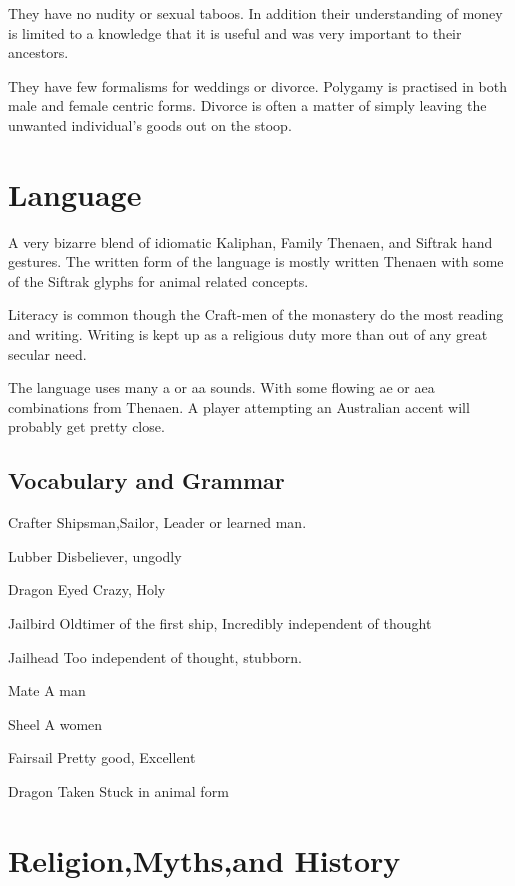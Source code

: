 They have no nudity or sexual taboos. In addition their understanding
of money is limited to a knowledge that it is useful and was very
important to their ancestors.

They have few formalisms for weddings or divorce. Polygamy is practised
in both male and female centric forms. Divorce is often a matter of 
simply leaving the unwanted individual's goods out on the stoop. 

\section{Language}

A very bizarre blend of idiomatic Kaliphan, Family Thenaen, and
Siftrak hand gestures. The written form of the language is mostly 
written Thenaen with some of the Siftrak glyphs for animal related concepts.

Literacy is common though the Craft-men of the monastery do the most reading
and writing. Writing is kept up as a religious duty more than out of any great 
secular need.

The language uses many a or aa sounds. With some flowing ae or aea 
combinations from Thenaen. A player attempting an Australian accent 
will probably get pretty close.

\subsection{Vocabulary and Grammar}

\begin{relate}
        \item[Crafter]  Shipsman,Sailor, Leader or learned man.
        \item[Lubber] Disbeliever, ungodly
        \item[Dragon Eyed] Crazy, Holy
        \item[Jailbird] Oldtimer of the first ship, Incredibly independent
        of thought
        \item[Jailhead] Too independent of thought, stubborn.
        \item[Mate] A man
        \item[Sheel] A women
        \item[Fairsail] Pretty good, Excellent
        \item[Dragon Taken] Stuck in animal form
\end{relate}

\section{Religion,Myths,and History}

